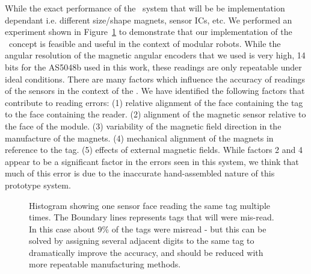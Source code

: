 While the exact performance of the \tagName~system that will be be implementation dependant i.e. different size/shape magnets, sensor ICs, etc. We performed an experiment shown in Figure~\ref{fig:histogram} to demonstrate that our implementation of the \tagName~concept is feasible and useful in the context of modular robots. While the angular resolution of the magnetic angular encoders that we used is very high, 14 bits for the AS5048b used in this work, these readings are only repeatable under ideal conditions. There are many factors which influence the accuracy of readings of the sensors in the context of the \tagNamePlural. We have identified the following factors that contribute to reading errors: (1) relative alignment of the face containing the tag to the face containing the reader. (2) alignment of the magnetic sensor relative to the face of the module. (3) variability of the magnetic field direction in the manufacture of the magnets. (4) mechanical alignment of the magnets in reference to the tag. (5) effects of external magnetic fields. While factors 2 and 4 appear to be a significant factor in the errors seen in this system, we think that much of this error is due to the inaccurate hand-assembled nature of this prototype system.

\begin{figure}[h]
	
	\caption{Histogram showing one sensor face reading the same tag multiple times. The Boundary lines represents tags that will were mis-read. In this case about 9\% of the tags were misread - but this can be solved by assigning several adjacent digits to the same tag to dramatically improve the accuracy, and should be reduced with more repeatable manufacturing methods.}
	\label{fig:histogram}
\end{figure}


%	
